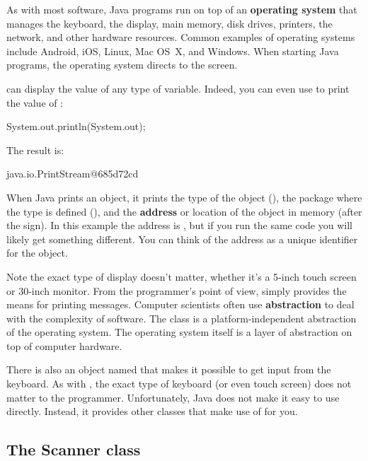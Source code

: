
As with most software, Java programs run on top of an {\bf operating system} that manages the keyboard, the display, main memory, disk drives, printers, the network, and other hardware resources.
Common examples of operating systems include Android, iOS, Linux, Mac OS~X, and Windows.
When starting Java programs, the operating system directs  to the screen.

 can display the value of any type of variable.
Indeed, you can even use  to print the value of :

\begin{code}
System.out.println(System.out);
\end{code}

The result is:

\begin{stdout}
java.io.PrintStream@685d72cd
\end{stdout}


When Java prints an object, it prints the type of the object (), the package where the type is defined (), and the {\bf address} or location of the object in memory (after the  sign).
In this example the address is , but if you run the same code you will likely get something different.
You can think of the address as a unique identifier for the object.


Note the exact type of display doesn't matter, whether it's a 5-inch touch screen or 30-inch monitor.
From the programmer's point of view,  simply provides the means for printing messages.
Computer scientists often use {\bf abstraction} to deal with the complexity of software.
The  class is a platform-independent abstraction of the operating system.
The operating system itself is a layer of abstraction on top of computer hardware.

There is also an object named  that makes it possible to get input from the keyboard.
As with , the exact type of keyboard (or even touch screen) does not matter to the programmer.
Unfortunately, Java does not make it easy to use  directly.
Instead, it provides other classes that make use of  for you.

\subsection{The Scanner class}

